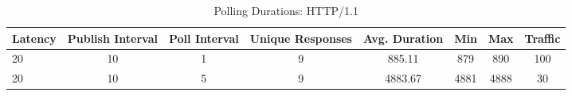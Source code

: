 
\begin{table}[H]
    \small\sffamily\centering\renewcommand{\arraystretch}{1.2}
    \caption{Polling Durations: HTTP/1.1}
    \label{undefined}

    
    \begin{tabular}{l|ccccccc}
        \hline
        \rowcolor{tableheadcolor}
         \bfseries Latency                                                    & \bfseries Publish Interval                                                                                                                                     & \bfseries Poll Interval                                                                                                          & \bfseries Unique Responses                                                                                                                                     & \bfseries Avg. Duration                                                                                                          & \bfseries Min                & \bfseries Max                & \bfseries Traffic                                                    \\
        \hline
 20                                                                   & 10                                                                                                                                                             & 1                                                                                                                                & 9                                                                                                                                                              & 885.11                                                                                                                           & 879                          & 890                          & 100                                                                  \\
 20                                                                   & 10                                                                                                                                                             & 5                                                                                                                                & 9                                                                                                                                                              & 4883.67                                                                                                                          & 4881                         & 4888                         & 30                                                                   \\

\end{tabular}
\end{table}
